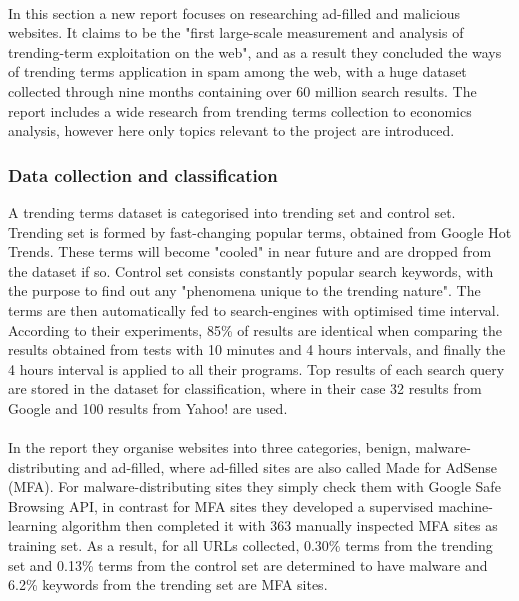 \paragraph{}
In this section a new report focuses on researching ad-filled and malicious
websites.\cite{moore2011fashion} It claims to be the "first large-scale measurement
and analysis of trending-term exploitation on the web", and as a result they
concluded the ways of trending terms application in spam among the web, with a
huge dataset collected through nine months containing over 60 million search
results. The report includes a wide research from trending terms collection to 
economics analysis, however here only topics relevant to the 
project are introduced. 
\subsubsection{Data collection and classification}
A trending terms dataset is categorised into trending set and control set. 
Trending set is formed by fast-changing popular terms, obtained from Google 
Hot Trends. These terms will become "cooled" in near future and are dropped 
from the dataset if so. Control set consists constantly popular search 
keywords, with the purpose to find out any "phenomena unique to the trending 
nature".\cite{moore2011fashion} The terms are then automatically fed to search-engines with optimised 
time interval. According to their experiments, 85\% of results are identical 
when comparing the results obtained from tests with 10 minutes and 4 hours 
intervals, and finally the 4 hours interval is applied to all their programs. Top 
results of each search query are stored in the dataset for classification, 
where in their case 32 results from Google and 100 results from Yahoo! are used.
\paragraph{}
In the report they organise websites into three categories, benign, 
malware-distributing and ad-filled, where ad-filled sites are also called Made 
for AdSense (MFA). For malware-distributing sites they simply check them with 
Google Safe Browsing API, in contrast for MFA sites they developed a 
supervised machine-learning algorithm then completed it with 363 manually 
inspected MFA sites as training set. As a result, for all URLs collected, 
0.30\% terms from the trending set and 0.13\% terms from the control set are determined to 
have malware and 6.2\% keywords from the trending set are MFA sites. 
